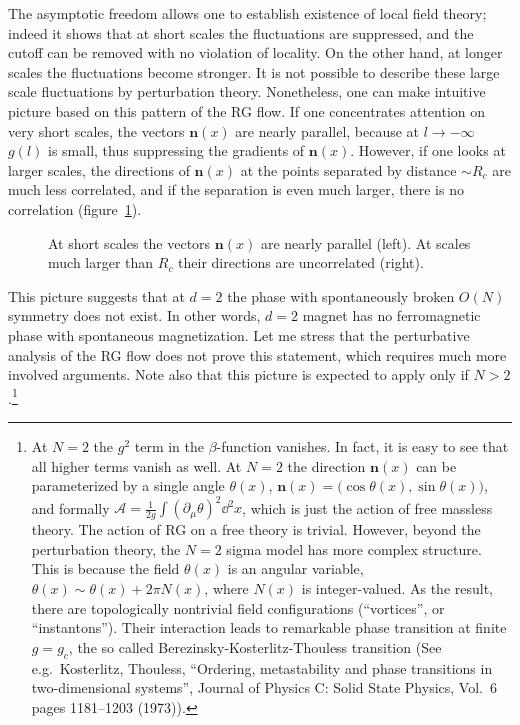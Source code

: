The asymptotic freedom allows one to establish existence of local field theory;
indeed it shows that at short scales the fluctuations are suppressed, and the
cutoff can be removed with no violation of locality. On the other hand, at longer
scales the fluctuations become stronger. It is not possible to describe these
large scale fluctuations by perturbation theory. Nonetheless, one can make
intuitive picture based on this pattern of the RG flow. If one concentrates
attention on very short scales, the vectors $\mathbf n(x)$ are nearly parallel,
because at $l\to-\infty$ $g(l)$ is small, thus suppressing the gradients of
$\mathbf n(x)$. However, if one looks at larger scales, the directions of
$\mathbf n(x)$ at the points separated by distance $\sim R_c$ are much less
correlated, and if the separation is even much larger, there is no correlation
(figure~\ref{fig:sigmascales}).
\begin{figure}[ht]
\centering{}
\caption{At short scales the vectors $\mathbf n(x)$ are nearly parallel (left).
At scales much larger than $R_c$ their directions are uncorrelated (right).}
\label{fig:sigmascales}
\end{figure}

This picture suggests that at $d=2$ the phase with spontaneously broken $O(N)$
symmetry does not exist. In other words, $d=2$ magnet has no ferromagnetic phase
with spontaneous magnetization. Let me stress that the perturbative analysis of
the RG flow does not prove this statement, which requires much more involved
arguments. Note also that this picture is expected to apply only if
$N>2$.\footnote{At $N=2$ the $g^2$ term in the $\beta$-function vanishes. In fact,
it is easy to see that all higher terms vanish as well. At $N=2$ the direction
$\mathbf n(x)$ can be parameterized by a single angle $\theta(x)$,
$\mathbf n(x)=\bigl(\cos\theta(x),\sin\theta(x)\bigr)$, and formally
$\mathcal A=\frac1{2g}\int(\partial_\mu\theta)^2\dd^2x$, which is just the action
of free massless theory. The action of RG on a free theory is trivial. However,
beyond the perturbation theory, the $N=2$ sigma model has more complex structure.
This is because the field $\theta(x)$ is an angular variable,
$\theta(x)\sim\theta(x)+2\pi N(x)$, where $N(x)$ is integer-valued. As the result,
there are topologically nontrivial field configurations (``vortices'', or
``instantons''). Their interaction leads to remarkable phase transition at finite
$g=g_c$, the so called Berezinsky-Kosterlitz-Thouless transition (See e.g.\
Kosterlitz, Thouless, ``Ordering, metastability and phase transitions in
two-dimensional systems'', Journal of Physics C: Solid State Physics, Vol.~6 pages
1181--1203 (1973)).}

